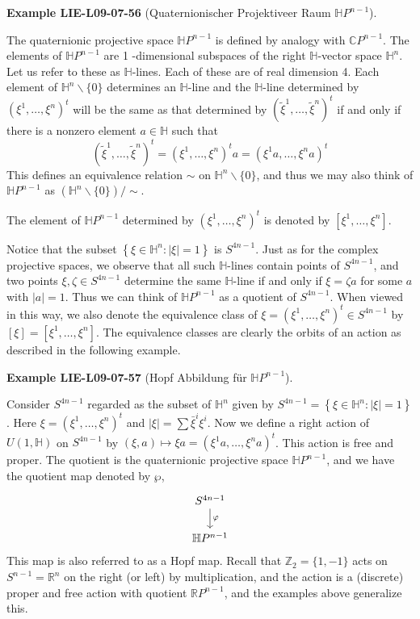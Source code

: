 \documentclass[10pt, letterpaper]{article}
\newcommand{\CustomHeading}[3]{%
  \par\medskip\noindent%
  \textbf{#1 #2} \textnormal{(#3)}.\enskip%
}
\newenvironment{EXA}[2]{\CustomHeading{Example}{#1}{#2}}{}
\begin{document}
\begin{EXA}{LIE-L09-07-56}{Quaternionischer Projektiveer Raum $\mathbb{H}P^{n-1}$}
The quaternionic projective space $\mathbb{H} P^{n-1}$ is defined by analogy with $\mathbb{C} P^{n-1}$. The elements of $\mathbb{H} P^{n-1}$ are 1 -dimensional subspaces of the right $\mathbb{H}$-vector space $\mathbb{H}^{n}$. Let us refer to these as $\mathbb{H}$-lines. Each of these are of real dimension 4. Each element of $\mathbb{H}^{n} \backslash\{0\}$ determines an $\mathbb{H}$-line and the $\mathbb{H}$-line determined by $\left(\xi^{1}, \ldots, \xi^{n}\right)^{t}$ will be the same as that determined by $\left(\widetilde{\xi}^{1}, \ldots, \widetilde{\xi}^{n}\right)^{t}$ if and only if there is a nonzero element $a \in \mathbb{H}$ such that 
$$\left(\widetilde{\xi}^{1}, \ldots, \widetilde{\xi}^{n}\right)^{t}=\left(\xi^{1}, \ldots, \xi^{n}\right)^{t} a=\left(\xi^{1} a, \ldots, \xi^{n} a\right)^{t}$$ 
This defines an equivalence relation $\sim$ on $\mathbb{H}^{n} \backslash\{0\}$, and thus we may also think of $\mathbb{H} P^{n-1}$ as $\left(\mathbb{H}^{n} \backslash\{0\}\right) / \sim$. 

The element of $\mathbb{H} P^{n-1}$ determined by $\left(\xi^{1}, \ldots, \xi^{n}\right)^{t}$ is denoted by $\left[\xi^{1}, \ldots, \xi^{n}\right]$. 

Notice that the subset $\left\{\xi \in \mathbb{H}^{n}:|\xi|=1\right\}$ is $S^{4 n-1}$. Just as for the complex projective spaces, we observe that all such $\mathbb{H}$-lines contain points of $S^{4 n-1}$, and two points $\xi, \zeta \in S^{4 n-1}$ determine the same $\mathbb{H}$-line if and only if $\xi=\zeta a$ for some $a$ with $|a|=1$. Thus we can think of $\mathbb{H} P^{n-1}$ as a quotient of $S^{4 n-1}$. When viewed in this way, we also denote the equivalence class of $\xi=\left(\xi^{1}, \ldots, \xi^{n}\right)^{t} \in S^{4 n-1}$ by $[\xi]=\left[\xi^{1}, \ldots, \xi^{n}\right]$. The equivalence classes are clearly the orbits of an action as described in the following example.
\end{EXA}

\begin{EXA}{LIE-L09-07-57}{Hopf Abbildung für $\mathbb{H}P^{n-1}$}
Consider $S^{4 n-1}$ regarded as the subset of $\mathbb{H}^{n}$ given by $S^{4 n-1}=\left\{\xi \in \mathbb{H}^{n}:|\xi|=1\right\}$. Here $\xi=\left(\xi^{1}, \ldots, \xi^{n}\right)^{t}$ and $|\xi|=\sum \bar{\xi}^{i} \xi^{i}$. Now we define a right action of $U(1, \mathbb{H})$ on $S^{4 n-1}$ by $(\xi, a) \mapsto \xi a=\left(\xi^{1} a, \ldots, \xi^{n} a\right)^{t}$. This action is free and proper. The quotient is the quaternionic projective space $\mathbb{H} P^{n-1}$, and we have the quotient map denoted by $\wp$,
\[
\begin{tikzcd}
S^{4n-1} \arrow[d, "\varphi"] \\
\mathbb{H}P^{n-1}
\end{tikzcd}
\]
This map is also referred to as a Hopf map. Recall that $\mathbb{Z}_{2}=\{1,-1\}$ acts on $S^{n-1}=\mathbb{R}^{n}$ on the right (or left) by multiplication, and the action is a (discrete) proper and free action with quotient $\mathbb{R} P^{n-1}$, and the examples above generalize this.
\end{EXA}
\end{document}
